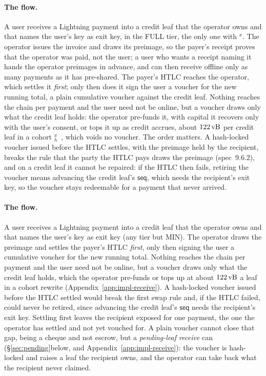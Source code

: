 
\iffullversion
\paragraph{The flow.} A user receives a Lightning payment into a credit
leaf that the operator owns and that names the user's key as exit key,
in the FULL tier, the only one with $^{x}$. The operator issues
the invoice and draws its preimage, so the payer's receipt proves that
the operator was paid, not the user; a user who wants a receipt naming
it hands the operator preimages in advance, and can then receive offline
only as many payments as it has pre-shared. The payer's HTLC reaches the
operator, which settles it \emph{first}; only then does it sign the user
a voucher for the new running total, a plain cumulative voucher against
the credit leaf. Nothing reaches the chain per payment and the user need
not be online, but a voucher draws only what the credit leaf holds: the
operator pre-funds it, with capital it recovers only with the user's
consent, or tops it up as credit accrues, about $122\,\mathrm{vB}$ per credit leaf
in a cohort $_h^{x}$~\cite{layertreerepo}, which voids no
voucher. The order matters. A
hash-locked voucher issued before the HTLC settles, with the preimage
held by the recipient, breaks the rule that the party the HTLC pays draws
the preimage (spec~9.6.2),
and on a credit leaf it cannot be repaired: if the
HTLC then fails, retiring the voucher means advancing the credit leaf's
$\mathsf{seq}$, which needs the recipient's exit key, so the voucher
stays redeemable for a payment that never arrived. \else
\paragraph{The flow.} A user receives a Lightning payment into a credit
leaf that the operator owns and that names the user's key as exit key (any
tier but MIN). The operator draws the preimage and settles the payer's HTLC
\emph{first}, only then signing the user a cumulative voucher for the new
running total. Nothing reaches the chain per payment and the user need not
be online, but a voucher draws only what the credit leaf holds, which the
operator pre-funds or tops up at about $122\,\mathrm{vB}$ a leaf in a cohort rewrite
(Appendix~\ref{app:impl-receive}). A hash-locked voucher issued before the
HTLC settled would break the first swap rule and, if the HTLC failed, could
never be retired, since advancing the credit leaf's $\mathsf{seq}$ needs the
recipient's exit key. \fi
Settling first leaves
the recipient exposed for one payment, the one the operator has settled
and not yet vouched for. A plain voucher cannot close that gap, being a
cheque and not escrow, but a \emph{pending-leaf receive} can
(\iffullversion\S\ref{sec:pending}\else below, and Appendix~\ref{app:impl-receive}\fi):
the voucher is hash-locked and raises a leaf the recipient owns, and the
operator can take back what the recipient never claimed.

